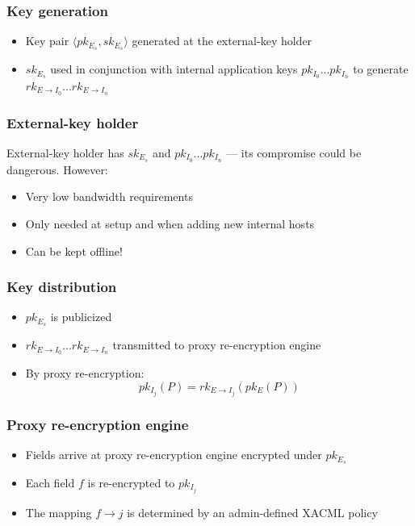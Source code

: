 \documentclass{beamer}
\begin{document}
\begin{frame}
\frametitle{Key generation}
\begin{itemize}
\item Key pair $\langle pk_{E_s}, sk_{E_s} \rangle$ generated at the
\alert{external-key holder}
\item $sk_{E_s}$ used in conjunction with internal application keys
$pk_{I_0}...pk_{I_n}$ to generate $rk_{E \to I_0}...rk_{E \to I_n}$
\end{itemize}
\end{frame}

\begin{frame}
\frametitle{External-key holder}
External-key holder has $sk_{E_s}$ and $pk_{I_0}...pk_{I_n}$ --- its compromise
could be dangerous.  However:
\smallskip
\begin{itemize}
\item Very low bandwidth requirements
\item Only needed at setup and when adding new internal hosts
\item Can be kept offline!
\end{itemize}
\end{frame}

\begin{frame}
\frametitle{Key distribution}
\begin{itemize}
\item $pk_{E_s}$ is publicized
\item $rk_{E \to I_0}...rk_{E \to I_n}$ transmitted to \alert{proxy
re-encryption engine}
\item By proxy re-encryption:
\begin{equation*}
pk_{I_j}(P) = rk_{E \to I_j}( pk_E (P))
\end{equation*}
\end{itemize}
\end{frame}

\begin{frame}
\frametitle{Proxy re-encryption engine}
\begin{itemize}
\item Fields arrive at proxy re-encryption engine encrypted under $pk_{E_s}$
\item Each field $f$ is re-encrypted to $pk_{I_j}$
\item The mapping $f \to j$ is determined by an admin-defined XACML policy
\end{itemize}
\end{frame}
\end{document}

